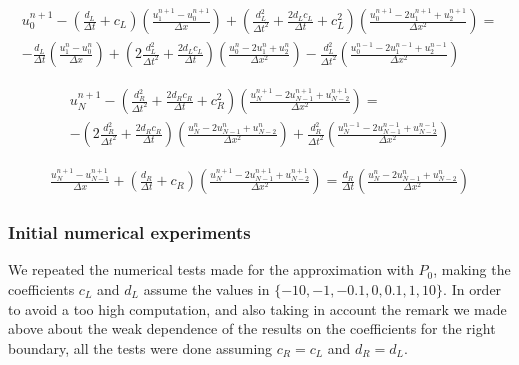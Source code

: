 \begin{equation*}
\label{eq:appDiscTBCP1}
	\begin{aligned}
    u_0^{n+1} - \left( \frac{d_L}{\Delta t} + c_L \right) \left( \frac{u_1^{n+1} - u_0^{n+1}}{\Delta x}\right) +   \left( \frac{d_L^2}{\Delta t^2} + \frac{2d_Lc_L}{\Delta t} + c_L^2  \right) \left(  \frac{u_0^{n+1} - 2u_1^{n+1} + u_2^{n+1}}{\Delta x^2} \right)  = \\
        -\frac{d_L}{\Delta t}\left( \frac{u_1^{n} - u_0^{n}}{\Delta x}\right) +  \left( 2\frac{d_L^2}{\Delta t^2} + \frac{2d_Lc_L}{\Delta t}\right) \left(  \frac{u_0^{n} - 2u_1^n + u_2^{n}}{\Delta x^2} \right)    -  \frac{d_L^2}{\Delta t^2} \left(  \frac{u_0^{n-1} - 2u_1^{n-1} + u_2^{n-1}}{\Delta x^2} \right)
   \end{aligned}
\end{equation*} 

\begin{equation*}
	\begin{aligned}
    u_N^{n+1} - \left( \frac{d_R^2}{\Delta t^2} + \frac{2d_Rc_R}{\Delta t} + c_R^2  \right) \left(  \frac{u_{N}^{n+1} - 2u_{N-1}^{n+1} + u_{N-2}^{n+1}}{\Delta x^2} \right) = \\
     -\left( 2\frac{d_R^2}{\Delta t^2} + \frac{2d_Rc_R}{\Delta t}\right) \left(  \frac{u_N^{n} - 2u_{N-1}^n + u_{N-2}^{n}}{\Delta x^2} \right) + \frac{d_R^2}{\Delta t^2} \left(  \frac{u_N^{n-1} - 2u_{N-1}^{n-1} + u_{N-2}^{n-1}}{\Delta x^2} \right)
    \end{aligned}
\end{equation*} 
   
\begin{equation*}
	\begin{aligned}	
    \frac{u_N^{n+1} - u_{N-1}^{n+1}}{\Delta x} + \left( \frac{d_R}{\Delta t} + c_R \right) \left( \frac{u_N^{n+1} -2 u_{N-1}^{n+1} + u_{N-2}^{n+1}}{\Delta x^2}\right) =      \frac{d_R}{\Delta t}\left( \frac{u_{N}^{n} - 2u_{N-1}^{n} + u_{N-2}^n}{\Delta x^2}\right)
    \end{aligned}
\end{equation*}

\subsubsection{Initial numerical experiments}

\indent We repeated the numerical tests made for the approximation with $P_0$, making the coefficients $c_L$ and $d_L$ assume the values in $\{-10,-1,-0.1,0,0.1,1,10\}$. In order to avoid a too high computation, and also taking in account the remark we made above about the weak dependence of the results on the coefficients for the right boundary, all the tests were done assuming $c_R = c_L$ and $d_R = d_L$.

